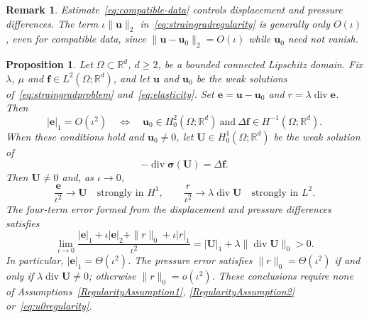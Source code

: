 \documentclass[10pt]{amsart}
\newtheorem{proposition}[theorem]{Proposition}
\newtheorem{remark}[theorem]{Remark}
\renewcommand{\div}{\operatorname{div}}
\numberwithin{equation}{section}
\begin{document}
\begin{remark}
Estimate~\eqref{eq:compatible-data} controls displacement and pressure differences. The term $\iota\|\boldsymbol u\|_2$ in~\eqref{eq:straingradregularity} is generally only $O(\iota)$, even for compatible data, since $\|\boldsymbol u-\boldsymbol u_0\|_2=O(\iota)$ while $\boldsymbol u_0$ need not vanish.
\end{remark}

\begin{proposition}\label{prop:compatible-leading}
Let $\Omega\subset\mathbb R^d$, $d\geq2$, be a bounded connected Lipschitz domain.
Fix $\lambda$, $\mu$ and $\boldsymbol f\in L^2(\Omega;\mathbb R^d)$, and let $\boldsymbol u$ and $\boldsymbol u_0$ be the weak solutions of~\eqref{eq:straingradproblem} and~\eqref{eq:elasticity}. Set $\boldsymbol e=\boldsymbol u-\boldsymbol u_0$ and $r=\lambda\div\boldsymbol e$. Then
\[
|\boldsymbol e|_1=O(\iota^2)
\quad\Longleftrightarrow\quad
\boldsymbol u_0\in H_0^2(\Omega;\mathbb R^d)
\ \text{and}\ \Delta\boldsymbol f\in H^{-1}(\Omega;\mathbb R^d).
\]
When these conditions hold and $\boldsymbol u_0\neq0$, let $\boldsymbol U\in H_0^1(\Omega;\mathbb R^d)$ be the weak solution of
\[
-\div\boldsymbol\sigma(\boldsymbol U)=\Delta\boldsymbol f.
\]
Then $\boldsymbol U\neq0$ and, as $\iota\to0$,
\begin{equation}\label{eq:compatible-leading-error}
\frac{\boldsymbol e}{\iota^2}\longrightarrow\boldsymbol U\quad\text{strongly in }H^1,
\qquad
\frac{r}{\iota^2}\longrightarrow\lambda\div\boldsymbol U\quad\text{strongly in }L^2.
\end{equation}
The four-term error formed from the displacement and pressure differences satisfies
\begin{equation}\label{eq:compatible-leading-coefficient}
\lim_{\iota\to0}
\frac{|\boldsymbol e|_1+\iota|\boldsymbol e|_2+\|r\|_0+\iota|r|_1}{\iota^2}
=|\boldsymbol U|_1+\lambda\|\div\boldsymbol U\|_0>0.
\end{equation}
In particular, $|\boldsymbol e|_1=\Theta(\iota^2)$. The pressure error satisfies $\|r\|_0=\Theta(\iota^2)$ if and only if $\lambda\div\boldsymbol U\neq0$; otherwise $\|r\|_0=o(\iota^2)$. These conclusions require none of Assumptions~\ref{RegularityAssumption1}, \ref{RegularityAssumption2} or~\eqref{eq:u0regularity}.
\end{proposition}
\end{document}
